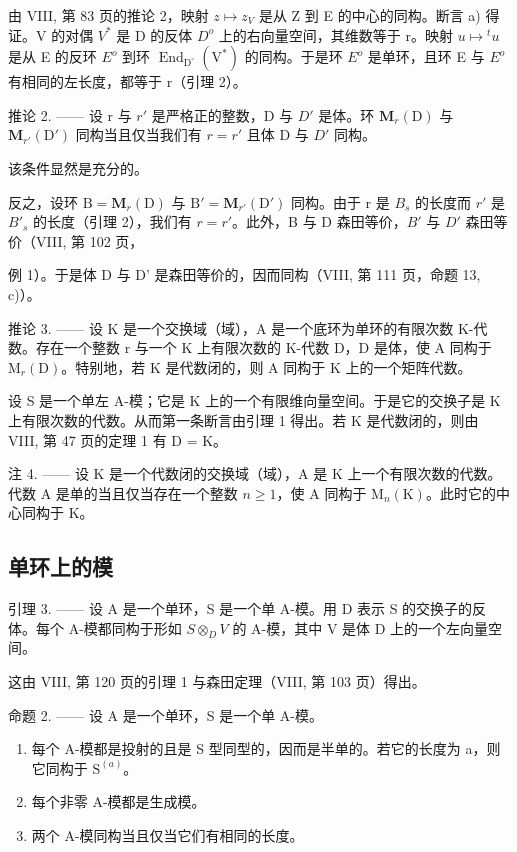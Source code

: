 由 VIII, 第 83 页的推论 2，映射 \(z \mapsto z_{V}\) 是从 Z 到 E 的中心的同构。断言 a) 得证。V 的对偶 \(V^{*}\) 是 D 的反体 \(D^{o}\) 上的右向量空间，其维数等于 r。映射 \(u \mapsto {}^{t}u\) 是从 E 的反环 \(E^{o}\) 到环 \(\operatorname{End}_{\mathrm{D}^{\circ}}(\mathrm{V}^{*})\) 的同构。于是环 \(E^{o}\) 是单环，且环 E 与 \(E^{o}\) 有相同的左长度，都等于 r（引理 2）。

推论 2. —— 设 r 与 \(r'\) 是严格正的整数，D 与 \(D'\) 是体。环 \(\mathbf{M}_{r}(\mathrm{D})\) 与 \(\mathbf{M}_{r'}(\mathrm{D}')\) 同构当且仅当我们有 \(r = r'\) 且体 D 与 \(D'\) 同构。

该条件显然是充分的。

反之，设环 \(\mathrm{B} = \mathbf{M}_{r}(\mathrm{D})\) 与 \(\mathrm{B}' = \mathbf{M}_{r'}(\mathrm{D}')\) 同构。由于 r 是 \(B_{s}\) 的长度而 \(r'\) 是 \(B'_{s}\) 的长度（引理 2），我们有 \(r = r'\)。此外，B 与 D 森田等价，\(B'\) 与 \(D'\) 森田等价（VIII, 第 102 页，

例 1）。于是体 D 与 D' 是森田等价的，因而同构（VIII, 第 111 页，命题 13, c)）。

推论 3. —— 设 K 是一个交换域（域），A 是一个底环为单环的有限次数 K-代数。存在一个整数 r 与一个 K 上有限次数的 K-代数 D，D 是体，使 A 同构于 \(\mathrm{M}_{r}(\mathrm{D})\)。特别地，若 K 是代数闭的，则 A 同构于 K 上的一个矩阵代数。

设 S 是一个单左 A-模；它是 K 上的一个有限维向量空间。于是它的交换子是 K 上有限次数的代数。从而第一条断言由引理 1 得出。若 K 是代数闭的，则由 VIII, 第 47 页的定理 1 有 D = K。

注 4. —— 设 K 是一个代数闭的交换域（域），A 是 K 上一个有限次数的代数。代数 A 是单的当且仅当存在一个整数 \(n \geqslant 1\)，使 A 同构于 \(\mathrm{M}_{n}(\mathrm{K})\)。此时它的中心同构于 K。

\subsection{单环上的模}

引理 3. —— 设 A 是一个单环，S 是一个单 A-模。用 D 表示 S 的交换子的反体。每个 A-模都同构于形如 \(S \otimes_{D} V\) 的 A-模，其中 V 是体 D 上的一个左向量空间。

这由 VIII, 第 120 页的引理 1 与森田定理（VIII, 第 103 页）得出。

命题 2. —— 设 A 是一个单环，S 是一个单 A-模。

\begin{enumerate}
\def\labelenumi{\alph{enumi})}
\item
  每个 A-模都是投射的且是 S 型同型的，因而是半单的。若它的长度为 a，则它同构于 \(\mathrm{S}^{(a)}\)。
\item
  每个非零 A-模都是生成模。
\item
  两个 A-模同构当且仅当它们有相同的长度。
\end{enumerate}

